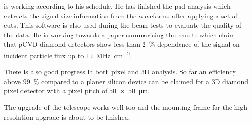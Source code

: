 \me is working according to his schedule. He has finished the pad analysis which extracts the signal size information from the waveforms after applying a set of cuts. This software is also used during the beam tests to evaluate the quality of the data. He is working towards a paper summarising the results which claim that \ac{pCVD} diamond detectors show less than \SI{2}{\%} dependence of the signal on incident particle flux up to \SI{10}{\mega\hertz\per\centi\meter^2}.\par
There is also good progress in both pixel and 3D analysis. So far an efficiency above \SI{99}{\%} compared to a planer silicon device can be claimed for a 3D diamond pixel detector with a pixel pitch of \SI{50x50}{\micro\meter}.\par 
The upgrade of the telescope works well too and the mounting frame for the high resolution upgrade is about to be finished. \parend